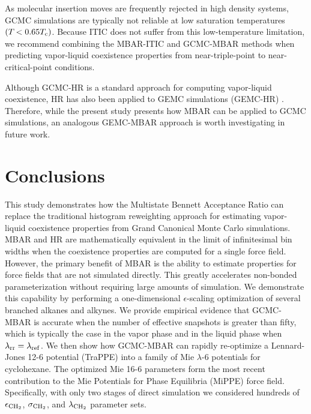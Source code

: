 \documentclass[journal=jced,manuscript=article]{achemso}
\begin{document}

As molecular insertion moves are frequently rejected in high density systems, GCMC simulations are typically not reliable at low saturation temperatures $(T_{\rm } < 0.65 T_{\rm c})$. Because ITIC does not suffer from this low-temperature limitation, we recommend combining the MBAR-ITIC and GCMC-MBAR methods when predicting vapor-liquid coexistence properties from near-triple-point to near-critical-point conditions.

Although GCMC-HR is a standard approach for computing vapor-liquid coexistence, HR has also been applied to GEMC simulations (GEMC-HR) \cite{Boulougouris2010}. Therefore, while the present study presents how MBAR can be applied to GCMC simulations, an analogous GEMC-MBAR approach is worth investigating in future work.

%

\section{Conclusions} \label{sec: Conclusions}

This study demonstrates how the Multistate Bennett Acceptance Ratio can replace the traditional histogram reweighting approach for estimating vapor-liquid coexistence properties from Grand Canonical Monte Carlo simulations. MBAR and HR are mathematically equivalent in the limit of infinitesimal bin widths when the coexistence properties are computed for a single force field. However, the primary benefit of MBAR is the ability to estimate properties for force fields that are not simulated directly. This greatly accelerates non-bonded parameterization without requiring large amounts of simulation. We demonstrate this capability by performing a one-dimensional $\epsilon$-scaling optimization of several branched alkanes and alkynes. We provide empirical evidence that GCMC-MBAR is accurate when the number of effective snapshots is greater than fifty, which is typically the case in the vapor phase and in the liquid phase when $\lambda_{\rm rr} = \lambda_{\rm ref}$. We then show how GCMC-MBAR can rapidly re-optimize a Lennard-Jones 12-6 potential (TraPPE) into a family of Mie $\lambda$-6 potentials for cyclohexane. The optimized Mie 16-6 parameters form the most recent contribution to the Mie Potentials for Phase Equilibria (MiPPE) force field. Specifically, with only two stages of direct simulation we considered hundreds of $\epsilon_{\rm CH_2}$, $\sigma_{\rm CH_2}$, and $\lambda_{\rm CH_2}$ parameter sets.
\end{document}
